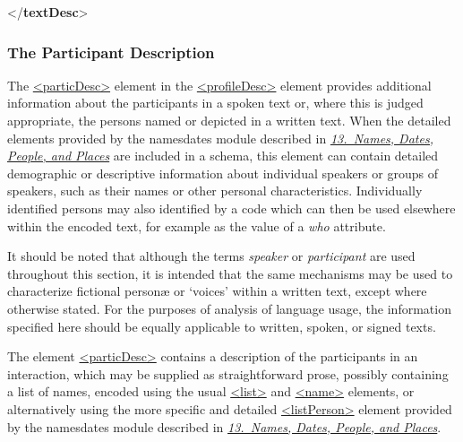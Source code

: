 \begin{shaded}
\mbox{}\newline 
{}\mbox{}\newline 
{</\textbf{textDesc}>}\end{shaded}\egroup\par \noindent  
\subsubsection[{The Participant Description}]{The Participant Description}\label{CCAHPA}\par
The \hyperref[TEI.particDesc]{<particDesc>} element in the \hyperref[TEI.profileDesc]{<profileDesc>} element provides additional information about the participants in a spoken text or, where this is judged appropriate, the persons named or depicted in a written text. When the detailed elements provided by the \textsf{namesdates} module described in \textit{\hyperref[ND]{13.\ Names, Dates, People, and Places}} are included in a schema, this element can contain detailed demographic or descriptive information about individual speakers or groups of speakers, such as their names or other personal characteristics. Individually identified persons may also identified by a code which can then be used elsewhere within the encoded text, for example as the value of a {\itshape who} attribute.\par
It should be noted that although the terms \textit{speaker} or \textit{participant} are used throughout this section, it is intended that the same mechanisms may be used to characterize fictional personæ or ‘voices’ within a written text, except where otherwise stated. For the purposes of analysis of language usage, the information specified here should be equally applicable to written, spoken, or signed texts.\par
The element \hyperref[TEI.particDesc]{<particDesc>} contains a description of the participants in an interaction, which may be supplied as straightforward prose, possibly containing a list of names, encoded using the usual \hyperref[TEI.list]{<list>} and \hyperref[TEI.name]{<name>} elements, or alternatively using the more specific and detailed \hyperref[TEI.listPerson]{<listPerson>} element provided by the \textsf{namesdates} module described in \textit{\hyperref[ND]{13.\ Names, Dates, People, and Places}}.\par
